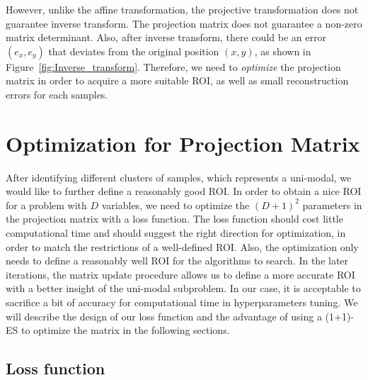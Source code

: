 However, unlike the affine transformation, the projective transformation does not guarantee inverse transform.
The projection matrix does not guarantee a non-zero matrix determinant.
Also, after inverse transform, 
there could be an error $(e_x, e_y)$ that deviates from the original position $(x, y)$, as shown in Figure~\ref{fig:Inverse_transform}.
Therefore, we need to \textit{optimize} the projection matrix in order to acquire a more suitable ROI, 
as well as small reconstruction errors for each samples.





\section{Optimization for Projection Matrix}

After identifying different clusters of samples, which represents a uni-modal, 
we would like to further define a reasonably good ROI.
In order to obtain a nice ROI for a problem with $D$ variables, 
we need to optimize the $(D+1)^2$ parameters in the projection matrix with a loss function.
The loss function should cost little computational time and should suggest the right direction for optimization, 
in order to match the restrictions of a well-defined ROI.
Also, the optimization only needs to define a reasonably well ROI for the algorithms to search.  
In the later iterations, the matrix update procedure allows us to define a more accurate ROI with a better insight of the uni-modal subproblem.
In our case, it is acceptable to sacrifice a bit of accuracy for computational time in hyperparameters tuning.  
We will describe the design of our loss function and the advantage of using a (1+1)-ES to optimize the matrix in the following sections.  


\subsection{Loss function}

